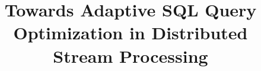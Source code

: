 \documentclass[sigconf]{acmart}
\theoremstyle{remark}
\begin{document}

\title {Towards Adaptive SQL Query Optimization in Distributed Stream Processing}







\end{document}
